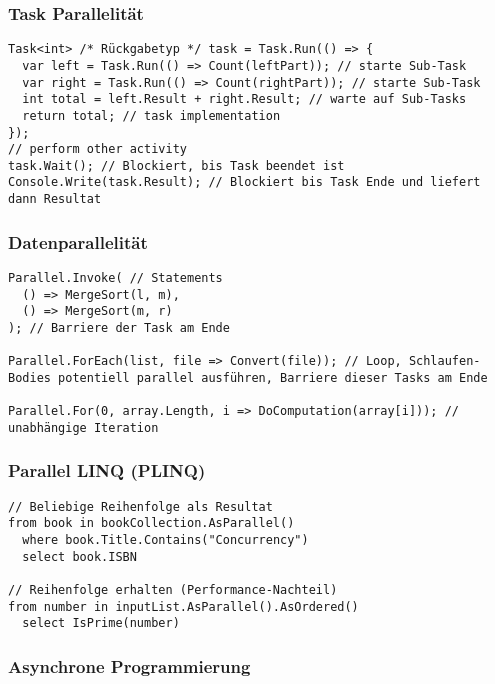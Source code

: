 \subsubsection{Task Parallelität}
\begin{lstlisting}
Task<int> /* Rückgabetyp */ task = Task.Run(() => {
  var left = Task.Run(() => Count(leftPart)); // starte Sub-Task
  var right = Task.Run(() => Count(rightPart)); // starte Sub-Task
  int total = left.Result + right.Result; // warte auf Sub-Tasks
  return total; // task implementation
});
// perform other activity
task.Wait(); // Blockiert, bis Task beendet ist
Console.Write(task.Result); // Blockiert bis Task Ende und liefert dann Resultat

\end{lstlisting}

\subsubsection{Datenparallelität}
\begin{lstlisting}
Parallel.Invoke( // Statements
  () => MergeSort(l, m),
  () => MergeSort(m, r)
); // Barriere der Task am Ende

Parallel.ForEach(list, file => Convert(file)); // Loop, Schlaufen-Bodies potentiell parallel ausführen, Barriere dieser Tasks am Ende

Parallel.For(0, array.Length, i => DoComputation(array[i])); // unabhängige Iteration
\end{lstlisting}


\subsubsection{Parallel LINQ (PLINQ)}

\begin{lstlisting}
// Beliebige Reihenfolge als Resultat
from book in bookCollection.AsParallel()
  where book.Title.Contains("Concurrency")
  select book.ISBN

// Reihenfolge erhalten (Performance-Nachteil)
from number in inputList.AsParallel().AsOrdered()
  select IsPrime(number)
\end{lstlisting}



\subsubsection{Asynchrone Programmierung}

